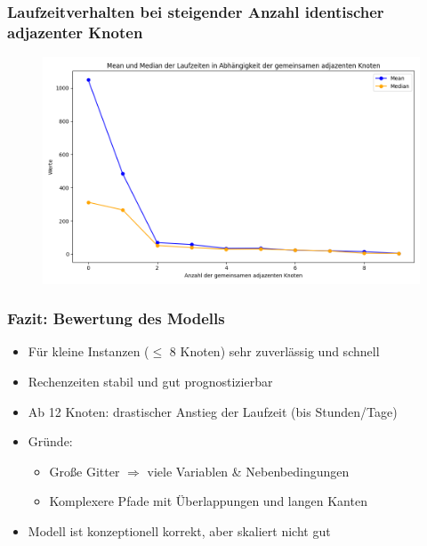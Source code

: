 \documentclass[9pt]{beamer}
\begin{document}
    \begin{frame}
    \frametitle{Laufzeitverhalten bei steigender Anzahl identischer adjazenter Knoten}
    \begin{figure}
        \centering
        \includegraphics[width=\textwidth]{figures/SimMeanMedian.png}
    \end{figure}
    \end{frame}

    \begin{frame}
    \frametitle{Fazit: Bewertung des Modells}
    \begin{itemize}
        \item Für kleine Instanzen ($\leq$ 8 Knoten) sehr zuverlässig und schnell
        \item Rechenzeiten stabil und gut prognostizierbar
        \item Ab 12 Knoten: drastischer Anstieg der Laufzeit (bis Stunden/Tage)
        \item Gründe:
        \begin{itemize}
            \item Große Gitter $\Rightarrow$ viele Variablen \& Nebenbedingungen
            \item Komplexere Pfade mit Überlappungen und langen Kanten
        \end{itemize}
        \item Modell ist konzeptionell korrekt, aber skaliert nicht gut
    \end{itemize}
    \end{frame}
\end{document}
